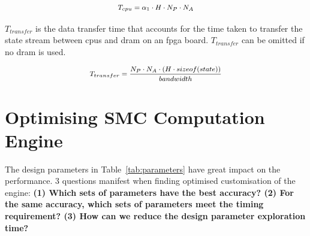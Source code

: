 \begin{equation}
\footnotesize
\begin{aligned}
T_{cpu} = \alpha_1 \cdot H \cdot N_P \cdot N_A
\end{aligned}
\end{equation}

$T_{transfer}$ is the data transfer time that accounts for the time taken to transfer the state stream between \gls{cpu}s and \gls{dram} on an \gls{fpga} board.
$T_{transfer}$ can be omitted if no \gls{dram} is used.

\begin{equation}
\footnotesize
\begin{aligned}
T_{transfer} = \frac{N_P \cdot N_A \cdot \left ( H \cdot sizeof(state)\right)}{bandwidth}
\end{aligned}
\end{equation}




\section{Optimising SMC Computation Engine}
\label{sec:optimisation}

The design parameters in Table~\ref{tab:parameters} have great impact on the performance.
3 questions manifest when finding optimised customisation of the engine:
\textbf{(1) Which sets of parameters have the best accuracy?
(2) For the same accuracy, which sets of parameters meet the timing requirement?
(3) How can we reduce the design parameter exploration time?}

